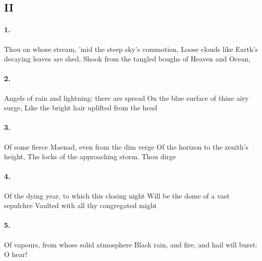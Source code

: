 \documentclass{mockDoc}
\begin{document}
		\subsection{II}
			\paragraph{1.}
				Thou on whose stream, 'mid the steep sky's commotion, \newline
				Loose clouds like Earth's decaying leaves are shed, \newline
				Shook from the tangled boughs of Heaven and Ocean,
			\paragraph{2.}
				Angels of rain and lightning: there are spread \newline
				On the blue surface of thine airy surge, \newline
				Like the bright hair uplifted from the head
			\paragraph{3.}
				Of some fierce Maenad, even from the dim verge \newline
				Of the horizon to the zenith's height, \newline
				The locks of the approaching storm. Thou dirge
			\paragraph{4.}
				Of the dying year, to which this closing night \newline
				Will be the dome of a vast sepulchre \newline
				Vaulted with all thy congregated might
			\paragraph{5.}
				Of vapours, from whose solid atmosphere \newline
				Black rain, and fire, and hail will burst: O hear!
\end{document}
